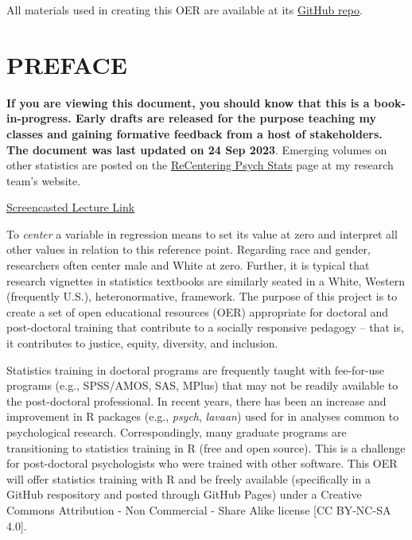 \documentclass[
  11pt,
]{book}
\begin{document}
All materials used in creating this OER are available at its \href{https://github.com/lhbikos/ReC_MultivModel}{GitHub repo}.

\hypertarget{preface}{%
\chapter*{PREFACE}\label{preface}}


\textbf{If you are viewing this document, you should know that this is a book-in-progress. Early drafts are released for the purpose teaching my classes and gaining formative feedback from a host of stakeholders. The document was last updated on 24 Sep 2023}. Emerging volumes on other statistics are posted on the \href{https://lhbikos.github.io/BikosRVT/ReCenter.html}{ReCentering Psych Stats} page at my research team's website.

\href{https://spu.hosted.panopto.com/Panopto/Pages/Viewer.aspx?id=c932455e-ef06-444a-bdca-acf7012d759a}{Screencasted Lecture Link}

To \emph{center} a variable in regression means to set its value at zero and interpret all other values in relation to this reference point. Regarding race and gender, researchers often center male and White at zero. Further, it is typical that research vignettes in statistics textbooks are similarly seated in a White, Western (frequently U.S.), heteronormative, framework. The purpose of this project is to create a set of open educational resources (OER) appropriate for doctoral and post-doctoral training that contribute to a socially responsive pedagogy -- that is, it contributes to justice, equity, diversity, and inclusion.

Statistics training in doctoral programs are frequently taught with fee-for-use programs (e.g., SPSS/AMOS, SAS, MPlus) that may not be readily available to the post-doctoral professional. In recent years, there has been an increase and improvement in R packages (e.g., \emph{psych}, \emph{lavaan}) used for in analyses common to psychological research. Correspondingly, many graduate programs are transitioning to statistics training in R (free and open source). This is a challenge for post-doctoral psychologists who were trained with other software. This OER will offer statistics training with R and be freely available (specifically in a GitHub respository and posted through GitHub Pages) under a Creative Commons Attribution - Non Commercial - Share Alike license {[}CC BY-NC-SA 4.0{]}.
\end{document}
